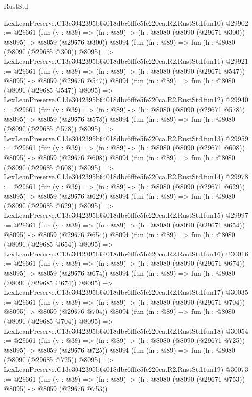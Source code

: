 \begin{lexlean}{RustStd}
\begin{coremodule}
    LexLeanPreserve.C13e3042395b64018dbc6fffe5fe220ca.R2.RustStd.fun10)
@29902 := @29661
    (fun (y : @39) => (fn : @89) -> (h : @8080 (@8090 (@29671 @300)) @8095) -> @8059 (@29676 @300))
    @8094
    (fun (fn : @89) =>
    fun (h : @8080 (@8090 (@29685 @300)) @8095) =>
    LexLeanPreserve.C13e3042395b64018dbc6fffe5fe220ca.R2.RustStd.fun11)
@29921 := @29661
    (fun (y : @39) => (fn : @89) -> (h : @8080 (@8090 (@29671 @547)) @8095) -> @8059 (@29676 @547))
    @8094
    (fun (fn : @89) =>
    fun (h : @8080 (@8090 (@29685 @547)) @8095) =>
    LexLeanPreserve.C13e3042395b64018dbc6fffe5fe220ca.R2.RustStd.fun12)
@29940 := @29661
    (fun (y : @39) => (fn : @89) -> (h : @8080 (@8090 (@29671 @578)) @8095) -> @8059 (@29676 @578))
    @8094
    (fun (fn : @89) =>
    fun (h : @8080 (@8090 (@29685 @578)) @8095) =>
    LexLeanPreserve.C13e3042395b64018dbc6fffe5fe220ca.R2.RustStd.fun13)
@29959 := @29661
    (fun (y : @39) => (fn : @89) -> (h : @8080 (@8090 (@29671 @608)) @8095) -> @8059 (@29676 @608))
    @8094
    (fun (fn : @89) =>
    fun (h : @8080 (@8090 (@29685 @608)) @8095) =>
    LexLeanPreserve.C13e3042395b64018dbc6fffe5fe220ca.R2.RustStd.fun14)
@29978 := @29661
    (fun (y : @39) => (fn : @89) -> (h : @8080 (@8090 (@29671 @629)) @8095) -> @8059 (@29676 @629))
    @8094
    (fun (fn : @89) =>
    fun (h : @8080 (@8090 (@29685 @629)) @8095) =>
    LexLeanPreserve.C13e3042395b64018dbc6fffe5fe220ca.R2.RustStd.fun15)
@29997 := @29661
    (fun (y : @39) => (fn : @89) -> (h : @8080 (@8090 (@29671 @654)) @8095) -> @8059 (@29676 @654))
    @8094
    (fun (fn : @89) =>
    fun (h : @8080 (@8090 (@29685 @654)) @8095) =>
    LexLeanPreserve.C13e3042395b64018dbc6fffe5fe220ca.R2.RustStd.fun16)
@30016 := @29661
    (fun (y : @39) => (fn : @89) -> (h : @8080 (@8090 (@29671 @674)) @8095) -> @8059 (@29676 @674))
    @8094
    (fun (fn : @89) =>
    fun (h : @8080 (@8090 (@29685 @674)) @8095) =>
    LexLeanPreserve.C13e3042395b64018dbc6fffe5fe220ca.R2.RustStd.fun17)
@30035 := @29661
    (fun (y : @39) => (fn : @89) -> (h : @8080 (@8090 (@29671 @704)) @8095) -> @8059 (@29676 @704))
    @8094
    (fun (fn : @89) =>
    fun (h : @8080 (@8090 (@29685 @704)) @8095) =>
    LexLeanPreserve.C13e3042395b64018dbc6fffe5fe220ca.R2.RustStd.fun18)
@30054 := @29661
    (fun (y : @39) => (fn : @89) -> (h : @8080 (@8090 (@29671 @725)) @8095) -> @8059 (@29676 @725))
    @8094
    (fun (fn : @89) =>
    fun (h : @8080 (@8090 (@29685 @725)) @8095) =>
    LexLeanPreserve.C13e3042395b64018dbc6fffe5fe220ca.R2.RustStd.fun19)
@30073 := @29661
    (fun (y : @39) => (fn : @89) -> (h : @8080 (@8090 (@29671 @753)) @8095) -> @8059 (@29676 @753))

\end{coremodule}
\end{lexlean}
